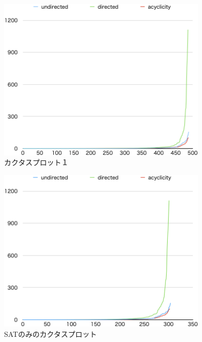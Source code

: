 \begin{figure}[htbp]
\begin{center}
  \includegraphics[width=10cm]{fig/cactus.png}
\caption{カクタスプロット１}
\label{cactus}
\end{center}
\end{figure}
\begin{figure}[htbp]
\begin{center}
  \includegraphics[width=10cm]{fig/cactussat.png}
\caption{SATのみのカクタスプロット}
\label{cactussat}
\end{center}
\end{figure}
